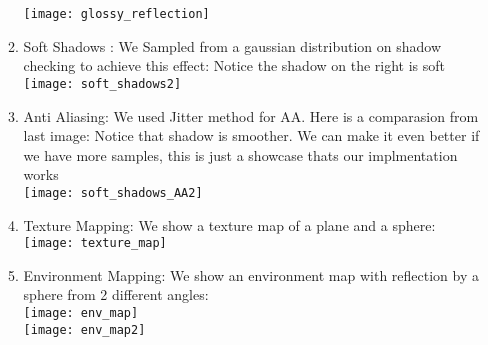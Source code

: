 \documentclass[10pt]{article}
\begin{document}
\begin{enumerate}
\begin{enumerate}
				\texttt{[image: glossy\_reflection]} \\
			\item Soft Shadows : We Sampled from a gaussian distribution on shadow checking to achieve this effect:  Notice the shadow on the right is soft\\
				\texttt{[image: soft\_shadows2]} \\
			\item Anti Aliasing:  We used Jitter method for AA.  Here is a comparasion from last image:  Notice that shadow is smoother.  We can make it even better if we have more samples, this is just a showcase thats our implmentation works\\
			\texttt{[image: soft\_shadows\_AA2]} \\
			\item Texture Mapping:  We show a texture map of a plane and a sphere:\\
				\texttt{[image: texture\_map]} \\
				
				\item Environment Mapping:  We show an environment map with reflection by a sphere from 2 different angles:\\
				\texttt{[image: env\_map]} \\
				\texttt{[image: env\_map2]} \\
		\end{enumerate}
	\end{enumerate}

	
\end{document}
